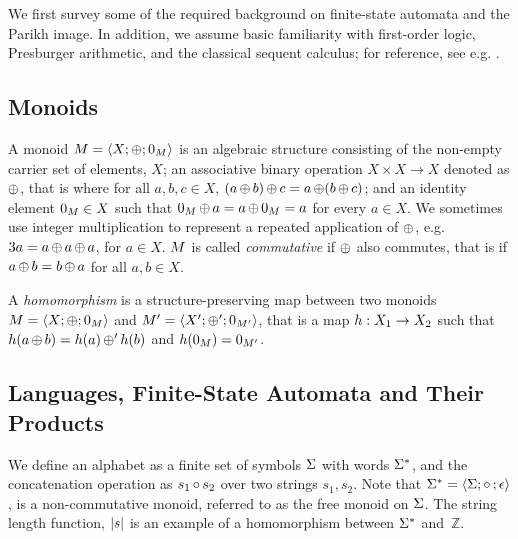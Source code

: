 We first survey some of the required background on finite-state
automata and the Parikh image. In addition, we assume basic familiarity
with first-order logic, Presburger
arithmetic, and the classical sequent calculus; for reference, see
e.g. \cite{Fitting96a}.

\subsection{Monoids}



A monoid $M = \left\langle X;\operatorname{\oplus};0_{M}\right\rangle$ is an algebraic structure
consisting of the non-empty carrier set of elements, $X$; an associative binary operation
$X \times X \rightarrow X$ denoted as $\operatorname{\oplus}$, that is where for all $a, b,
c \in X$, $(a \operatorname{\oplus} b) \operatorname{\oplus} c = a \operatorname{\oplus} (b \operatorname{\oplus} c)$; 
and an identity element $0_{M} \in X$ such that
$0_{M} \operatorname{\oplus} a = a \operatorname{\oplus} 0_{M} =   a$ for every $a \in X$.
We sometimes use integer multiplication to represent a repeated application of
$\operatorname{\oplus}$, e.g. $3a = a \operatorname{\oplus} a \operatorname{\oplus} a$, for $a \in X$. $M$ is
called \textit{commutative} if $\operatorname{\oplus}$ also commutes, that is if $a
\operatorname{\oplus} b = b \operatorname{\oplus} a$ for all $a, b \in X$. 

A \textit{homomorphism} is a structure-preserving map between two
monoids $M = \left\langle X;\operatorname{\oplus};0_{M}\right\rangle$ and
$M' = \left\langle X';\operatorname{\oplus}';0_{M'}\right\rangle$, that is a map
$h : X_1 \rightarrow X_2$ such that
$h(a \operatorname{\oplus} b) = h(a) \operatorname{\oplus}' h(b)$ and
$h(0_{M}) = 0_{M'}$.

%
%

\subsection{Languages, Finite-State Automata and Their Products}\label{sec:languages}

We define an alphabet as a finite set of symbols $\Sigma$ with words $\Sigma^*$, and
the concatenation operation as $s_1 \operatorname{\circ}{} s_2$ over two strings $s_1, s_2$.
Note that $\Sigma^* = \left\langle\Sigma;\operatorname{\circ}{};\epsilon\right\rangle$, is a
non-commutative monoid, referred to as the free monoid on $\Sigma$.
The string length
function, $|s|$ is an example of a homomorphism between $\Sigma^*$
and~$\mathbb{Z}$.

